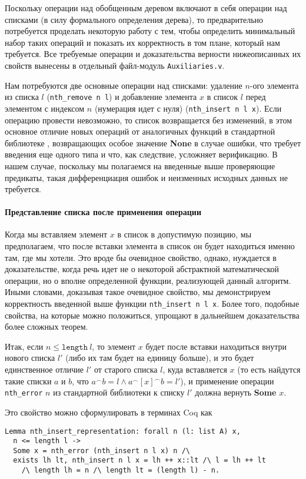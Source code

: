 Поскольку операции над обобщенным деревом включают в себя операции над списками (в силу формального определения дерева), то предварительно потребуется проделать некоторую работу с тем, чтобы определить минимальный набор таких операций и показать их корректность в том плане, который нам требуется. Все требуемые операции и доказательства верности нижеописанных их свойств вынесены в отдельный файл-модуль \texttt{Auxiliaries.v}.

Нам потребуются две основные операции над списками: удаление $n$-ого элемента из списка $l$ (\texttt{nth\_remove n l}) и добавление элемента $x$ в список $l$ перед элементом с индексом $n$ (нумерация идет с нуля) (\texttt{nth\_insert n l x}). Если операцию провести невозможно, то список возвращается без изменений, в этом основное отличие новых операций от аналогичных функций в стандартной библиотеке \tcoq, возвращающих особое значение \textbf{None} в случае ошибки, что требует введения еще одного типа и что, как следствие, усложняет верификацию. В нашем случае, поскольку мы полагаемся на введенные выше проверяющие предикаты, такая дифференциация ошибок и неизменных исходных данных не требуется.

\paragraph{Представление списка после применения операции} Когда мы вставляем элемент $x$ в список в допустимую позицию, мы предполагаем, что после вставки элемента в список он будет находиться именно там, где мы хотели. Это вроде бы очевидное свойство, однако, нуждается в доказательстве, когда речь идет не о некоторой абстрактной математической операции, но о вполне определенной функции, реализующей данный алгоритм. Иными словами, доказывая такое очевидное свойство, мы демонстрируем корректность введенной выше функции \texttt{nth\_insert n l x}. Более того, подобные свойства, на которые можно положиться, упрощают в дальнейшем доказательства более сложных теорем.

Итак, если $n \leq \texttt{length}\ l$, то элемент $x$ будет после вставки находиться внутри нового списка $l'$ (либо их там будет на единицу больше), и это будет единственное отличие $l'$ от старого списка $l$, куда вставляется $x$ (то есть найдутся такие списки $a$ и $b$, что $a^\frown  b = l \wedge a^\frown [x]^\frown b = l'$),  и применение операции \texttt{nth\_error} $n$ из стандартной библиотеки к списку $l'$ должна вернуть \textbf{Some} $x$.

Это свойство можно сформулировать в терминах Coq как
\begin{lstlisting}
Lemma nth_insert_representation: forall n (l: list A) x,
  n <= length l ->
  Some x = nth_error (nth_insert n l x) n /\
  exists lh lt, nth_insert n l x = lh ++ x::lt /\ l = lh ++ lt
    /\ length lh = n /\ length lt = (length l) - n.
 \end{lstlisting}

